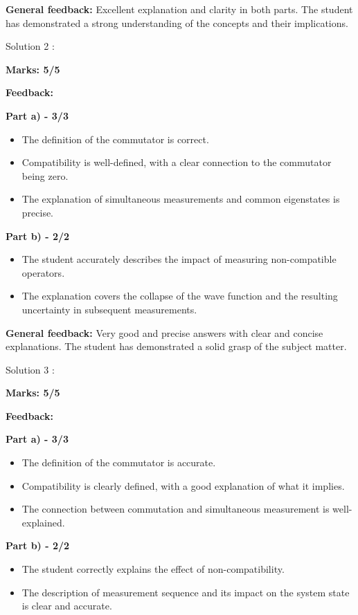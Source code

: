 \documentclass[a4paper,11pt]{article}
\begin{document}
\textbf{General feedback:}
Excellent explanation and clarity in both parts. The student has demonstrated a strong understanding of the concepts and their implications.



Solution 2 :

\textbf{Marks: 5/5}

\textbf{Feedback:}

\textbf{Part a) - 3/3}

\begin{itemize}
    \item The definition of the commutator is correct.
    \item Compatibility is well-defined, with a clear connection to the commutator being zero.
    \item The explanation of simultaneous measurements and common eigenstates is precise.
\end{itemize}

\textbf{Part b) - 2/2}

\begin{itemize}
    \item The student accurately describes the impact of measuring non-compatible operators.
    \item The explanation covers the collapse of the wave function and the resulting uncertainty in subsequent measurements.
\end{itemize}

\textbf{General feedback:}
Very good and precise answers with clear and concise explanations. The student has demonstrated a solid grasp of the subject matter.



Solution 3 :

\textbf{Marks: 5/5}

\textbf{Feedback:}

\textbf{Part a) - 3/3}

\begin{itemize}
    \item The definition of the commutator is accurate.
    \item Compatibility is clearly defined, with a good explanation of what it implies.
    \item The connection between commutation and simultaneous measurement is well-explained.
\end{itemize}

\textbf{Part b) - 2/2}

\begin{itemize}
    \item The student correctly explains the effect of non-compatibility.
    \item The description of measurement sequence and its impact on the system state is clear and accurate.
\end{itemize}
\end{document}
